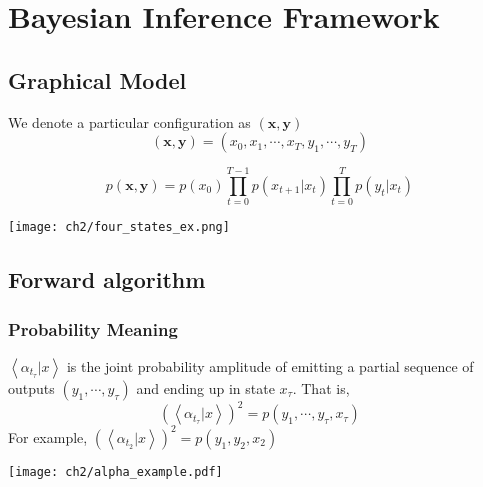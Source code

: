 \chapter{Bayesian Inference Framework}
\section{Graphical Model}
\begin{definition}
We denote a particular configuration as $(\textbf{x}, \textbf{y})$
\begin{equation}
(\textbf{x}, \textbf{y})=(x_0, x_1, \cdots, x_T, y_1, \cdots, y_T)
\end{equation}
\end{definition}

\begin{definition}
\begin{equation}
p(\textbf{x}, \textbf{y})= p(x_0)\prod_{t=0}^{T-1} p(x_{t+1}|x_t) \prod_{t=0}^{T}p(y_t|x_t)
\end{equation}
\end{definition}
\begin{center}
        \texttt{[image: ch2/four\_states\_ex.png]}   
\end{center}

\section{Forward algorithm}
\subsection{Probability Meaning}
$ \left<\alpha_{t_{\tau}}|x \right>$ is the joint probability amplitude of emitting a partial sequence of outputs $(y_1,\cdots,y_{\tau})$ and ending up in state $x_{\tau}$. That is,
\begin{equation}
        (\left<\alpha_{t_{\tau}}|x \right>)^2 = p(y_1,\cdots,y_{\tau}, x_{\tau})
\end{equation}
For example, $(\left<\alpha_{t_2}|x \right>)^2 = p(y_1, y_2, x_2)$
\begin{center}
        \texttt{[image: ch2/alpha\_example.pdf]}
\end{center}
